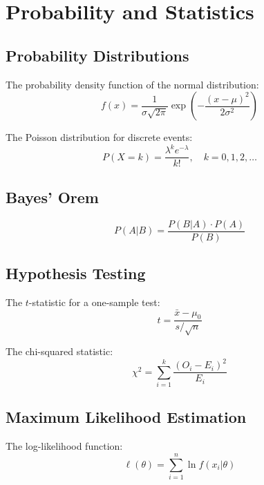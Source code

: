 \documentclass[11pt]{article}
\begin{document}
\section{Probability and Statistics}
\label{sec:stats}

\subsection{Probability Distributions}

The probability density function of the normal distribution:
\begin{equation}
  f(x) = \frac{1}{\sigma\sqrt{2\pi}} \exp\left(-\frac{(x-\mu)^2}{2\sigma^2}\right)
  \label{eq:normal}
\end{equation}

The Poisson distribution for discrete events:
\begin{equation}
  P(X = k) = \frac{\lambda^k e^{-\lambda}}{k!}, \quad k = 0, 1, 2, \ldots
  \label{eq:poisson}
\end{equation}

\subsection{Bayes' Orem}

\begin{equation}
  P(A|B) = \frac{P(B|A) \cdot P(A)}{P(B)}
  \label{eq:bayes}
\end{equation}

\subsection{Hypothesis Testing}

The $t$-statistic for a one-sample test:
\begin{equation}
  t = \frac{\bar{x} - \mu_0}{s / \sqrt{n}}
  \label{eq:ttest}
\end{equation}

The chi-squared statistic:
\begin{equation}
  \chi^2 = \sum_{i=1}^{k} \frac{(O_i - E_i)^2}{E_i}
  \label{eq:chisq}
\end{equation}

\subsection{Maximum Likelihood Estimation}

The log-likelihood function:
\begin{equation}
  \ell(\theta) = \sum_{i=1}^{n} \ln f(x_i | \theta)
  \label{eq:loglik}
\end{equation}
\end{document}
